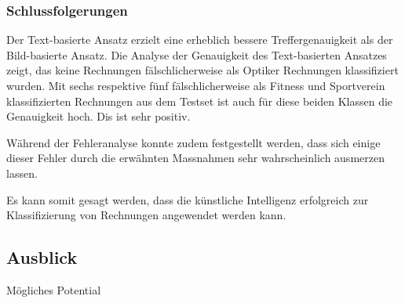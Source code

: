 \subsubsection{Schlussfolgerungen}

Der Text-basierte Ansatz erzielt eine erheblich bessere Treffergenauigkeit als der Bild-basierte Ansatz. Die Analyse der Genauigkeit des Text-basierten Ansatzes zeigt, das keine Rechnungen fälschlicherweise als Optiker Rechnungen klassifiziert wurden. Mit sechs respektive fünf fälschlicherweise als Fitness und Sportverein klassifizierten Rechnungen aus dem Testset ist auch für diese beiden Klassen die Genauigkeit hoch. Dis ist sehr positiv.

Während der Fehleranalyse konnte zudem festgestellt werden, dass sich einige dieser Fehler durch die erwähnten Massnahmen sehr wahrscheinlich ausmerzen lassen.

Es kann somit gesagt werden, dass die künstliche Intelligenz erfolgreich zur Klassifizierung von Rechnungen angewendet werden kann.


\subsection{Ausblick}

Mögliches Potential
